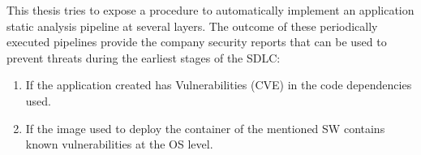 This thesis tries to expose a procedure to automatically implement an application static analysis pipeline at several layers. The outcome of these periodically executed pipelines provide the company security reports that can be used to prevent threats during the earliest stages of the \gls{SDLC}:

\begin{enumerate}
\item If the application created has Vulnerabilities (\gls{CVE}\cite{cve2017}) in the code dependencies used.
\item If the image used to deploy the container of the mentioned \gls{SW} contains known vulnerabilities at the \gls{OS} level.
\end{enumerate}

